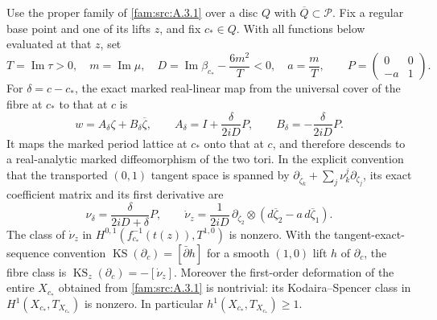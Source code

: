 \begin{proposition}
\hypertarget{tag-01Q4}{}\label{fam:src:A.4.2}\label{fam:st:A.4.2}
\hypertarget{tag-03DP}{}\label{wb:thm:retained-period-deformation}
Use the proper family of \cref{fam:src:A.3.1} over a disc
$Q$ with $\overline Q\subset\mathcal P$.
Fix a regular base point and one of its lifts $z$, and fix
$c_*\in Q$. With all functions below evaluated at that $z$, set
\begin{equation}
 T=\operatorname{Im}\tau>0,\quad m=\operatorname{Im}\mu,\quad
 D=\operatorname{Im}\beta_{c_*}-\frac{6m^2}{T}<0,\quad a=\frac mT,
 \qquad P=\begin{pmatrix}0&0\\-a&1\end{pmatrix}.
\label{pub:I:eq:PD3}
\end{equation}
For $\delta=c-c_*$, the exact marked real-linear map from the universal
cover of the fibre at $c_*$ to that at $c$ is
\begin{equation}
 w=A_\delta\zeta+B_\delta\overline\zeta,\qquad
 A_\delta=I+\frac{\delta}{2iD}P,\qquad
 B_\delta=-\frac{\delta}{2iD}P.
\label{pub:I:eq:PD4}
\end{equation}
It maps the marked period lattice at $c_*$ onto that at $c$, and
therefore descends to a real-analytic marked diffeomorphism of the two
tori. In the explicit convention that the transported $(0,1)$ tangent
space is spanned by
$\partial_{\overline\zeta_k}+\sum_j\nu^j_k\partial_{\zeta_j}$,
its exact coefficient matrix and its first derivative are
\begin{equation}
 \nu_\delta=\frac{\delta}{2iD+\delta}P,\qquad
 \dot\nu_z=\frac{1}{2iD}\,
 \partial_{\zeta_2}\otimes
 (d\overline\zeta_2-a\,d\overline\zeta_1).
\label{pub:I:eq:PD5}
\end{equation}
The class of $\dot\nu_z$ in
$H^{0,1}(f_{c_*}^{-1}(t(z)),T^{1,0})$ is nonzero.
With the tangent-exact-sequence convention
$\operatorname{KS}(\partial_c)=[\bar\partial h]$ for a smooth
$(1,0)$ lift $h$ of $\partial_c$, the fibre class is
$\operatorname{KS}_z(\partial_c)=-[\dot\nu_z]$.
Moreover the first-order deformation of the entire $X_{c_*}$ obtained
from \cref{fam:src:A.3.1} is nontrivial: its Kodaira--Spencer class in
$H^1(X_{c_*},T_{X_{c_*}})$ is nonzero. In particular
$h^1(X_{c_*},T_{X_{c_*}})\geq1$.
\end{proposition}
